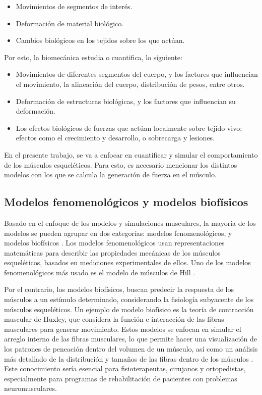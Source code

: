 \begin{itemize}
	\item Movimientos de segmentos de interés.
	\item Deformación de material biológico.
	\item Cambios biológicos en los tejidos sobre los que actúan.
\end{itemize}

Por esto, la biomecánica estudia o cuantifica, lo siguiente:

\begin{itemize}
	\item Movimientos de diferentes segmentos del cuerpo, y los factores que influencian el movimiento, la alineación del cuerpo, distribución de pesos, entre otros.
	\item Deformación de estructuras biológicas, y los factores que influencian su deformación.
	\item Los efectos biológicos de fuerzas que actúan localmente sobre tejido vivo; efectos como el crecimiento y desarrollo, o sobrecarga y lesiones.
\end{itemize}

En el presente trabajo, se va a enfocar en cuantificar y simular el comportamiento de los músculos esqueléticos. Para esto, es necesario mencionar los distintos modelos con los que se calcula la generación de fuerza en el músculo.

\subsection{Modelos fenomenológicos y modelos biofísicos}

Basado en el enfoque de los modelos y simulaciones musculares, la mayoría de los modelos se pueden agrupar en dos categorías: modelos fenomenológicos, y modelos biofísicos \citep{tang20093d,rohrle2012physiologically}. Los modelos fenomenológicos usan representaciones matemáticas para describir las propiedades mecánicas de los músculos esqueléticos, basados en mediciones experimentales de ellos. Uno de los modelos fenomenológicos más usado es el modelo de músculos de Hill \citep{hill1970first}.

Por el contrario, los modelos biofísicos, buscan predecir la respuesta de los músculos a un estímulo determinado, considerando la fisiología subyacente de los músculos esqueléticos. Un ejemplo de modelo biofísico es la teoría de contracción muscular de Huxley, que considera la función e interacción de las fibras musculares para generar movimiento. Estos modelos se enfocan en simular el arreglo interno de las fibras musculares, lo que permite hacer una visualización de los patrones de peneación dentro del volumen de un músculo, así como un análisis más detallado de la distribución y tamaños de las fibras dentro de los músculos \citep{ng2001muscle}. Este conocimiento sería esencial para fisioterapeutas, cirujanos y ortopedistas, especialmente para programas de rehabilitación de pacientes con problemas neuromusculares. 

